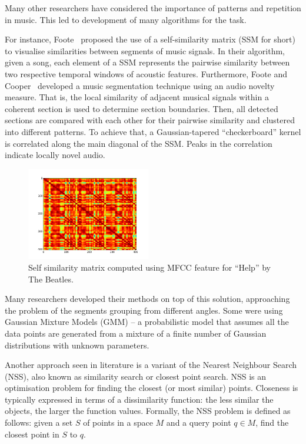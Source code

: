 Many other researchers have considered the importance of patterns and repetition in music. This led to development of many algorithms for the task.


For instance, Foote~\cite{Foote} proposed the use of a self-similarity matrix (SSM for short) to visualise similarities between segments of music signals. In their algorithm, given a song, each element of a SSM represents the pairwise similarity between two respective temporal windows of acoustic features. Furthermore, Foote and Cooper~\cite{FooteCooper} developed a music segmentation technique using an audio novelty measure. That is, the local similarity of adjacent musical signals within a coherent section is used to determine section boundaries. Then, all detected sections are compared with each other for their pairwise similarity and clustered into different patterns. To achieve that, a Gaussian-tapered ``checkerboard'' kernel is correlated along the main diagonal of the SSM.  Peaks in the correlation indicate locally novel audio.


\begin{figure}
  \begin{center}
    \includegraphics[width=0.48\textwidth]{Figures/mfcc_no_log_sync}
  \end{center}
  \caption{Self similarity matrix computed using MFCC feature for ``Help'' by The Beatles.}
  \label{fig:SSMbach}
\end{figure}

Many researchers developed their methods on top of this solution, approaching the problem of the segments grouping from different angles. Some were using Gaussian Mixture Models (GMM) -- a probabilistic model that assumes all the data points are generated from a mixture of a finite number of Gaussian distributions with unknown parameters. 

Another approach seen in literature is a variant of the Nearest Neighbour Search (NSS), also known as similarity search or closest point search. NSS is an optimisation problem for finding the closest (or most similar) points. Closeness is typically expressed in terms of a dissimilarity function: the less similar the objects, the larger the function values. Formally, the NSS problem is defined as follows: given a set $S$ of points in a space $M$ and a query point $q \in M$, find the closest point in $S$ to $q$.

